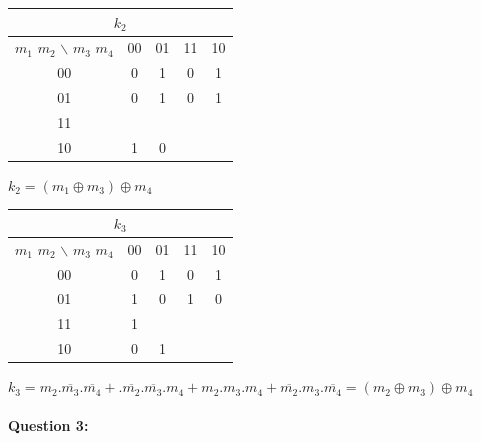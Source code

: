 \begin{minipage}{0.45\linewidth}
\begin{center}
\begin{tabular}{|c|c|c|c|c|}
\hline
\multicolumn{5}{|c|}{$k_2$} \\
\hline
$m_1$ $m_2$ $\backslash$ $m_3$ $m_4$ & 00 & 01 & 11 & 10 \\
\hline
00  & 0 & \cellcolor{bleuf} 1 & 0 & \cellcolor{bleuf} 1  \\
\hline
01  & 0 & \cellcolor{bleuf} 1 & 0 &  \cellcolor{bleuf} 1 \\
\hline
11  & \cellcolor{bleuf} &  & \cellcolor{bleuf} &  \\
\hline
10  & \cellcolor{bleuf} 1 & 0 & \cellcolor{bleuf} &  \\
\hline
\end{tabular} 
\end{center}
\end{minipage}\hfill
\begin{minipage}{0.45\linewidth}
$k_2=(m_1 \oplus m_3) \oplus m_4$
\end{minipage}

\begin{minipage}{0.45\linewidth}
\begin{center}
\begin{tabular}{|c|c|c|c|c|}
\hline
\multicolumn{5}{|c|}{$k_3$} \\
\hline
$m_1$ $m_2$ $\backslash$ $m_3$ $m_4$ & 00 & 01 & 11 & 10 \\
\hline
00  & 0 & \cellcolor{bleuf} 1 & 0 & \cellcolor{bleuf} 1 \\
\hline
01  & \cellcolor{bleuf}1 & 0 &  \cellcolor{bleuf} 1 & 0 \\
\hline
11  & \cellcolor{bleuf}1 &   & \cellcolor{bleuf} &  \\
\hline
10  & 0 & \cellcolor{bleuf} 1 &  & \cellcolor{bleuf}  \\
\hline
\end{tabular} 
\end{center}
\end{minipage}\hfill
\begin{minipage}{0.45\linewidth}
$k_3=m_2.\overline{m_3}.\overline{m_4}+.\overline{m_2}.\overline{m_3}.m_4+m_2.m_3.m_4+\overline{m_2}.m_3.\overline{m_4}=(m_2 \oplus m_3) \oplus m_4$
\end{minipage}

\paragraph{Question 3:}

